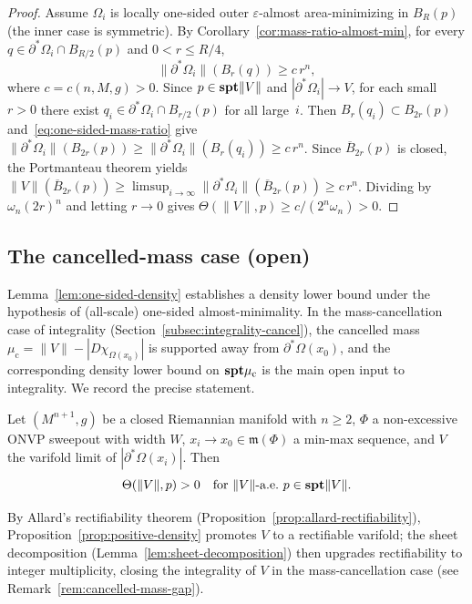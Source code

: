 \begin{proof}
Assume $\Omega_i$ is locally one-sided outer $\varepsilon$-almost area-minimizing in $B_R(p)$ (the inner case is symmetric).
By Corollary~\ref{cor:mass-ratio-almost-min}, for every $q \in \partial^*\Omega_i \cap B_{R/2}(p)$ and $0 < r \leq R/4$,
\begin{equation}\label{eq:one-sided-mass-ratio}
    \|\partial^*\Omega_i\|(B_r(q)) \geq c\,r^n,
\end{equation}
where $c = c(n, M, g) > 0$.
Since $p \in \mathbf{spt}\|V\|$ and $|\partial^*\Omega_i| \to V$, for each small $r > 0$ there exist $q_i \in \partial^*\Omega_i \cap B_{r/2}(p)$ for all large~$i$.
Then $B_r(q_i) \subset B_{2r}(p)$ and~\eqref{eq:one-sided-mass-ratio} give
$\|\partial^*\Omega_i\|(B_{2r}(p)) \geq \|\partial^*\Omega_i\|(B_r(q_i)) \geq c\,r^n$.
Since $\overline{B}_{2r}(p)$ is closed, the Portmanteau theorem yields
$\|V\|(\overline{B}_{2r}(p)) \geq \limsup_{i \to \infty} \|\partial^*\Omega_i\|(\overline{B}_{2r}(p)) \geq c\,r^n$.
Dividing by $\omega_n (2r)^n$ and letting $r \to 0$ gives $\Theta(\|V\|, p) \geq c/(2^n \omega_n) > 0$.
\end{proof}

\subsection{The cancelled-mass case (open)}\label{subsec:cancelled-mass-open}

Lemma~\ref{lem:one-sided-density} establishes a density lower bound under the hypothesis of (all-scale) one-sided almost-minimality. In the mass-cancellation case of integrality (Section~\ref{subsec:integrality-cancel}), the cancelled mass $\mu_{\mathrm{c}} = \|V\| - |D\chi_{\Omega(x_0)}|$ is supported away from $\partial^*\Omega(x_0)$, and the corresponding density lower bound on $\mathbf{spt}\mu_{\mathrm{c}}$ is the main open input to integrality. We record the precise statement.

\begin{proposition}\label{prop:positive-density}
Let $(M^{n+1}, g)$ be a closed Riemannian manifold with $n \geq 2$, $\Phi$ a non-excessive ONVP sweepout with width $W$, $x_i \to x_0 \in \mathfrak{m}(\Phi)$ a min-max sequence, and $V$ the varifold limit of $|\partial^*\Omega(x_i)|$. Then
\[
    \Theta(\|V\|, p) > 0 \quad \text{for } \|V\|\text{-a.e.\ } p \in \mathbf{spt}\|V\|.
\]
\end{proposition}

By Allard's rectifiability theorem (Proposition~\ref{prop:allard-rectifiability}), Proposition~\ref{prop:positive-density} promotes $V$ to a rectifiable varifold; the sheet decomposition (Lemma~\ref{lem:sheet-decomposition}) then upgrades rectifiability to integer multiplicity, closing the integrality of $V$ in the mass-cancellation case (see Remark~\ref{rem:cancelled-mass-gap}).

